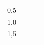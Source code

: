 {\begin{center}
\begin{xtabular*}{\mytablewidth}[t]{|p{10\mystarwidth}|p{10\mystarwidth}|p{10\mystarwidth}|p{10\mystarwidth}|}
        0,5 &
    
    
         &
    
    
         &
    
    
     \tabularnewline{}
    
    
        1,0 &
    
    
         &
    
    
         &
    
    
     \tabularnewline{}
    
    
        1,5 &
    

\end{xtabular*}
\end{center}}
